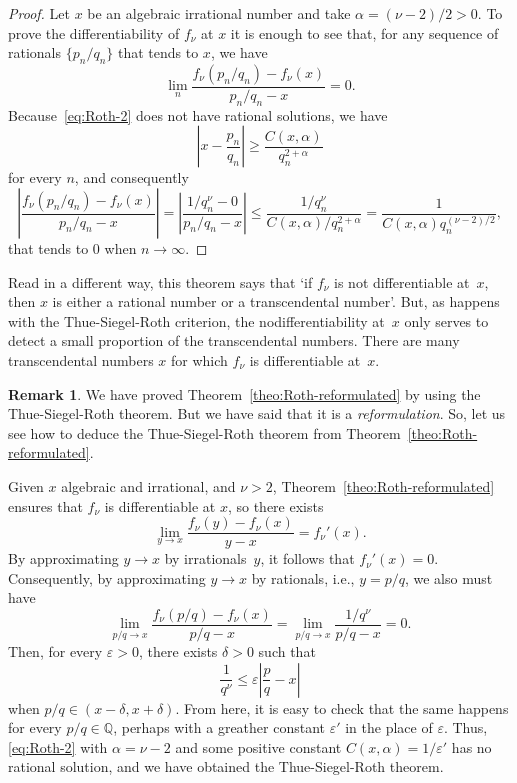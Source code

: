 \documentclass[11pt,a4paper,reqno]{amsart}
\def\Q{\mathbb{Q}}
\theoremstyle{plain}
\theoremstyle{definition}
\newtheorem{remark}{Remark}
\begin{document}
\begin{proof}
Let $x$ be an algebraic irrational number and 
take $\alpha = (\nu-2)/2 > 0$.
To prove the differentiability of $f_\nu$ at $x$ it is enough to see that, 
for any sequence of rationals $\{p_n/q_n\}$ that tends to $x$, we have
$$
  \lim_n \frac{f_\nu(p_n/q_n) - f_\nu(x)}{p_n/q_n - x} = 0.
$$
Because~\eqref{eq:Roth-2} does not have rational solutions, we have
$$
  \left| x - \frac{p_n}{q_n} \right| 
  \ge \frac{C(x,\alpha)}{q_n^{2+\alpha}}
$$
for every $n$, and consequently
$$
  \left|\frac{f_\nu(p_n/q_n) - f_\nu(x)}{p_n/q_n - x} \right| 
  = \left| \frac{1/q_n^\nu - 0}{p_n/q_n - x} \right| 
  \le \frac{1/q_n^\nu}{C(x,\alpha)/q_n^{2+\alpha}} 
  = \frac{1}{C(x,\alpha) q_n^{(\nu-2)/2}},
$$
that tends to $0$ when $n\to\infty$. 
\end{proof}

Read in a different way, this theorem says that
`if $f_\nu$ is not differentiable at~$x$, then $x$ is either
a rational number or a transcendental number'.
But, as happens with the Thue-Siegel-Roth criterion,
the nodifferentiability at~$x$ 
only serves to detect a small proportion of the 
transcendental numbers. There are many transcendental numbers $x$
for which $f_\nu$ is differentiable at~$x$.

\begin{remark}
We have proved Theorem~\ref{theo:Roth-reformulated}
by using the Thue-Siegel-Roth theorem.
But we have said that it is a \emph{reformulation}. So, let us see how to deduce 
the Thue-Siegel-Roth theorem from Theorem~\ref{theo:Roth-reformulated}.

Given $x$ algebraic and irrational, and $\nu > 2$, 
Theorem~\ref{theo:Roth-reformulated} ensures that $f_\nu$ is differentiable 
at $x$, so there exists
$$
  \lim_{y \to x} \frac{f_\nu(y)-f_\nu(x)}{y-x} = f_\nu'(x).
$$
By approximating $y \to x$ by irrationals~$y$, it follows that $f_\nu'(x)=0$.
Consequently, by approximating $y \to x$ by rationals, i.e., $y=p/q$, we also must have
$$
  \lim_{p/q \to x} \frac{f_\nu(p/q)-f_\nu(x)}{p/q-x} 
  = \lim_{p/q \to x} \frac{1/q^\nu}{p/q-x} = 0.
$$
Then, for every $\varepsilon>0$, there exists $\delta>0$ such that
$$
  \frac{1}{q^\nu} \le \varepsilon \left| \frac{p}{q} - x \right|
$$
when $p/q \in (x-\delta,x+\delta)$. From here, it is easy to
check that the same happens for every $p/q \in \Q$, perhaps with a greather 
constant $\varepsilon'$ in the place of $\varepsilon$.
Thus, \eqref{eq:Roth-2} with $\alpha=\nu-2$ and some positive constant 
$C(x,\alpha) = 1/\varepsilon'$ has no rational solution, and we have obtained the 
Thue-Siegel-Roth theorem.
\end{remark}
\end{document}
